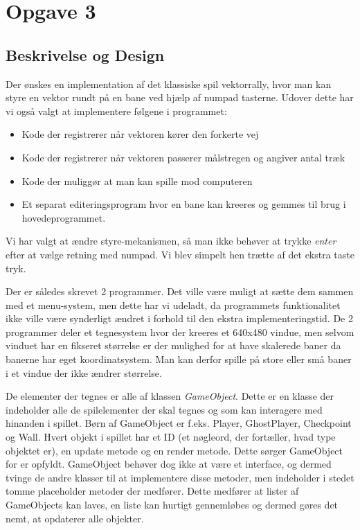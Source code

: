 \section{Opgave 3}
\subsection{Beskrivelse og Design}
Der ønskes en implementation af det klassiske spil vektorrally,
hvor man kan styre en vektor rundt på en bane ved hjælp af numpad tasterne.
Udover dette har vi også valgt at implementere følgene i programmet:
\begin{itemize}
  \item Kode der registrerer når vektoren kører den forkerte vej
  \item Kode der registrerer når vektoren passerer målstregen og angiver antal træk
  \item Kode der muliggør at man kan spille mod computeren
  \item Et separat editeringsprogram hvor en bane kan kreeres og gemmes til brug i hovedeprogrammet.
\end{itemize}

Vi har valgt at ændre styre-mekanismen, så man ikke behøver at trykke \emph{enter} efter at vælge retning med numpad.
Vi blev simpelt hen trætte af det ekstra taste tryk.

Der er således skrevet 2 programmer. Det ville være muligt at sætte dem sammen med et menu-system,
men dette har vi udeladt, da programmets funktionalitet ikke ville være synderligt ændret i forhold til den ekstra implementeringstid.
De 2 programmer deler et tegnesystem hvor der kreeres et 640x480 vindue,
men selvom vinduet har en fikseret størrelse er der mulighed for at have skalerede baner da banerne har eget koordinatsystem.
Man kan derfor spille på store eller små baner i et vindue der ikke ændrer størrelse.

De elementer der tegnes er alle af klassen \emph{GameObject}. %
Dette er en klasse der indeholder alle de spilelementer der skal tegnes og som kan interagere med hinanden i spillet.
Børn af GameObject er f.eks. Player, GhostPlayer, Checkpoint og Wall. Hvert objekt i spillet har et ID
(et nøgleord, der fortæller, hvad type objektet er), en update metode og en render metode.
Dette sørger GameObject for er opfyldt. GameObject behøver dog ikke at være et interface,
og dermed tvinge de andre klasser til at implementere disse metoder,
men indeholder i stedet tomme placeholder metoder der medfører.
Dette medfører at lister af GameObjects kan laves,
en liste kan hurtigt gennemløbes og dermed gøres det nemt, at opdaterer alle objekter.

